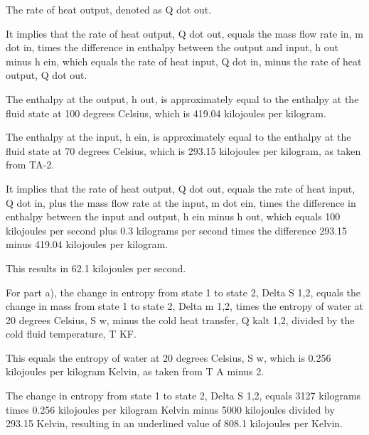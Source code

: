 The rate of heat output, denoted as Q dot out.

It implies that the rate of heat output, Q dot out, equals the mass flow rate in, m dot in, times the difference in enthalpy between the output and input, h out minus h ein, which equals the rate of heat input, Q dot in, minus the rate of heat output, Q dot out.

The enthalpy at the output, h out, is approximately equal to the enthalpy at the fluid state at 100 degrees Celsius, which is 419.04 kilojoules per kilogram.

The enthalpy at the input, h ein, is approximately equal to the enthalpy at the fluid state at 70 degrees Celsius, which is 293.15 kilojoules per kilogram, as taken from TA-2.

It implies that the rate of heat output, Q dot out, equals the rate of heat input, Q dot in, plus the mass flow rate at the input, m dot ein, times the difference in enthalpy between the input and output, h ein minus h out, which equals 100 kilojoules per second plus 0.3 kilograms per second times the difference 293.15 minus 419.04 kilojoules per kilogram.

This results in 62.1 kilojoules per second.

For part a), the change in entropy from state 1 to state 2, Delta S 1,2, equals the change in mass from state 1 to state 2, Delta m 1,2, times the entropy of water at 20 degrees Celsius, S w, minus the cold heat transfer, Q kalt 1,2, divided by the cold fluid temperature, T KF.

This equals the entropy of water at 20 degrees Celsius, S w, which is 0.256 kilojoules per kilogram Kelvin, as taken from T A minus 2.

The change in entropy from state 1 to state 2, Delta S 1,2, equals 3127 kilograms times 0.256 kilojoules per kilogram Kelvin minus 5000 kilojoules divided by 293.15 Kelvin, resulting in an underlined value of 808.1 kilojoules per Kelvin.